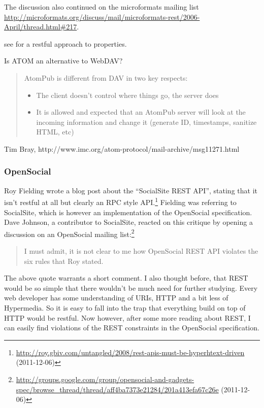 \documentclass[12pt,a4paper]{scrartcl}		%
\newcommand{\citeurl}[2]{\url{#1} (#2)}
\begin{document}
The discussion also continued on the microformats mailing list
\url{http://microformats.org/discuss/mail/microformats-rest/2006-April/thread.html#217}.

see \cite{Amundsen2010} for a restful approach to properties.

Is ATOM an alternative to WebDAV?

\begin{quote}
  AtomPub is different from DAV in two key respects:
  \begin{itemize}
  \item The client doesn't control where things go, the server does
  \item It is allowed and expected that an AtomPub server will look at the incoming information and change it (generate ID, timestamps, sanitize HTML, etc)
  \end{itemize}
\end{quote}
Tim Bray, http://www.imc.org/atom-protocol/mail-archive/msg11271.html

\subsubsection{OpenSocial}

Roy Fielding wrote a blog post about the ``SocialSite REST API'', stating that
it isn't restful at all but clearly an RPC style
API.\footnote{\citeurl{http://roy.gbiv.com/untangled/2008/rest-apis-must-be-hyperhtext-driven}{2011-12-06}}
Fielding was referring to SocialSite, which is however an implementation of the
OpenSocial specification. Dave Johnson, a contributor to SocialSite, reacted on
this critique by opening a discussion on an OpenSocial mailing
list:\footnote{\citeurl{http://groups.google.com/group/opensocial-and-gadgets-spec/browse_thread/thread/aff4ba7373e21284/201a413efa67c26e}{2011-12-06}}
\begin{quote}
  I must admit, it is not clear to me how OpenSocial REST API violates the six
  rules that Roy stated.
\end{quote}
The above quote warrants a short comment. I also thought before, that REST would
be so simple that there wouldn't be much need for further studying. Every web
developer has some understanding of URIs, HTTP and a bit less of Hypermedia. So
it is easy to fall into the trap that everything build on top of HTTP would be
restful. Now however, after some more reading about REST, I can easily find
violations of the REST constraints in the OpenSocial specification.
\end{document}
